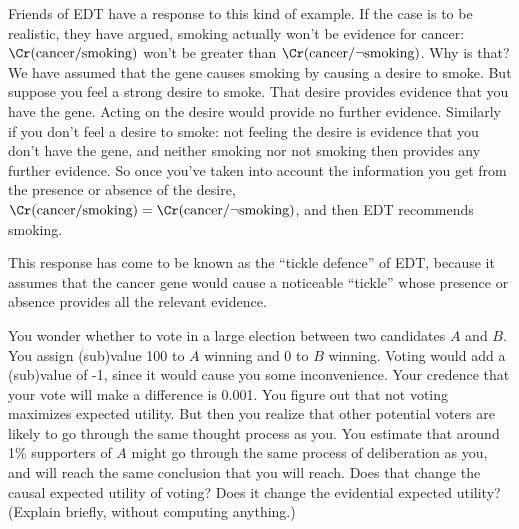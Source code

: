 Friends of EDT have a response to this kind of example. If the case is
to be realistic, they have argued, smoking actually won't be evidence
for cancer: $\Cr(\text{cancer}/\text{smoking})$ won't be greater than
$\Cr(\text{cancer}/\neg \text{smoking})$. Why is that? We have assumed that the
gene causes smoking by causing a desire to smoke. But suppose you feel
a strong desire to smoke. That desire provides evidence that you have
the gene. Acting on the desire would provide no further
evidence. Similarly if you don't feel a desire to smoke: not feeling
the desire is evidence that you don't have the gene, and neither
smoking nor not smoking then provides any further evidence. So once
you've taken into account the information you get from the presence or
absence of the desire,
$\Cr(\text{cancer}/\text{smoking})=\Cr(\text{cancer}/\neg
\text{smoking})$, and then EDT recommends smoking.

This response has come to be known as the ``tickle defence'' of EDT,
because it assumes that the cancer gene would cause a noticeable
``tickle'' whose presence or absence provides all the relevant
evidence. 

\begin{exercise}{1}
  You wonder whether to vote in a large election between two
  candidates $A$ and $B$. You assign (sub)value 100 to $A$ winning and
  0 to $B$ winning. Voting would add a (sub)value of -1, since it
  would cause you some inconvenience. Your credence that your vote
  will make a difference is 0.001. You figure out that not voting
  maximizes expected utility. But then you realize that other
  potential voters are likely to go through the same thought process
  as you. You estimate that around 1\% supporters of $A$ might go
  through the same process of deliberation as you, and will reach the
  same conclusion that you will reach. Does that change the causal
  expected utility of voting?  Does it change the evidential expected
  utility? (Explain briefly, without computing anything.) 
\end{exercise}




